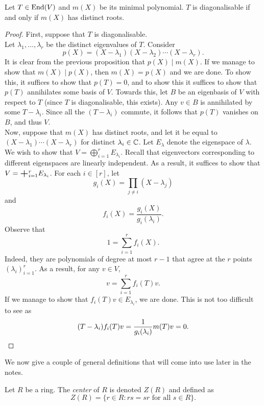 		\begin{ftheo}
			\label{diagonalisable iff min poly has distinct roots}
			Let $T \in \operatorname{End}(V)$ and $m(X)$ be its minimal polynomial. $T$ is diagonalisable if and only if $m(X)$ has distinct roots.
		\end{ftheo}
		\begin{proof}
			First, suppose that $T$ is diagonalisable.\\
			Let $\lambda_1,\ldots,\lambda_r$ be the distinct eigenvalues of $T$. Consider
			\[ p(X) = (X - \lambda_1) (X - \lambda_2) \cdots (X - \lambda_r). \]
			It is clear from the previous proposition that $p(X) \mid m(X)$. If we manage to show that $m(X) \mid p(X)$, then $m(X) = p(X)$ and we are done. To show this, it suffices to show that $p(T) = 0$, and to show this it suffices to show that $p(T)$ annihilates some basis of $V$. Towards this, let $B$ be an eigenbasis of $V$ with respect to $T$ (since $T$ is diagonalisable, this exists). Any $v \in B$ is annihilated by some $T - \lambda_i$. Since all the $(T-\lambda_i)$ commute, it follows that $p(T)$ vanishes on $B$, and thus $V$.\\

			Now, suppose that $m(X)$ has distinct roots, and let it be equal to $(X-\lambda_1) \cdots (X-\lambda_r)$ for distinct $\lambda_i \in \mathbb{C}$. Let $E_\lambda$ denote the eigenspace of $\lambda$. We wish to show that $V = \bigoplus_{i=1}^r E_{\lambda_i}$. Recall that eigenvectors corresponding to different eigenspaces are linearly independent. As a result, it suffices to show that $V = \bigplus_{i=1}^r E_{\lambda_i}$. For each $i \in [r]$, let
			\[ g_i(X) = \prod_{j \ne i} (X - \lambda_j) \]
			and
			\[ f_i(X) = \frac{g_i(X)}{g_i(\lambda_i)}. \]
			Observe that
			\[ 1 = \sum_{i=1}^r f_i(X). \]
			Indeed, they are polynomials of degree at most $r-1$ that agree at the $r$ points $(\lambda_i)_{i=1}^r$. As a result, for any $v \in V$,
			\[ v = \sum_{i=1}^r f_i(T)v. \]
			If we manage to show that $f_i(T)v \in E_{\lambda_i}$, we are done.
			This is not too difficult to see as
			\[ (T - \lambda_i) f_i(T)v = \frac{1}{g_i(\lambda_i)} m(T) v = 0. \qedhere \]
		\end{proof}

		We now give a couple of general definitions that will come into use later in the notes.

		\begin{fdef}[Center]
			\label{def: center of ring}
			Let $R$ be a ring. The \emph{center} of $R$ is denoted $Z(R)$ and defined as
			\[ Z(R) = \{ r \in R : rs = sr \text{ for all $s\in R$} \}. \]
		\end{fdef}

